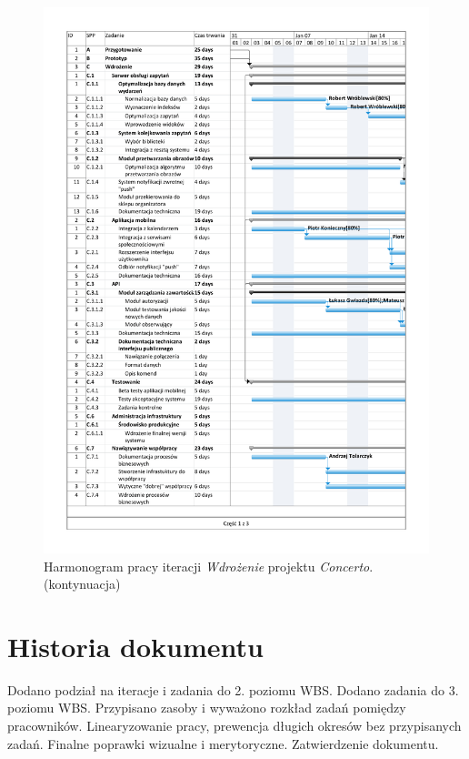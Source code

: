 \documentclass[10pt]{dokument-ppi}
\begin{document}
\begin{figure}[p]
    \ContinuedFloat
    \includegraphics[trim=1.2cm 1.2cm 1.2cm 1.2cm, page=3, width=\textwidth]{./figury/harmonogram-pracy-C-wdrozenie}
    \caption[]{Harmonogram pracy iteracji \emph{Wdrożenie} projektu \emph{Concerto}. (kontynuacja)}
\end{figure}


\section{Historia dokumentu}
\begin{versions}
        Dodano podział na iteracje i zadania do 2. poziomu WBS.
        Dodano zadania do 3. poziomu WBS.
        Przypisano zasoby i wyważono rozkład zadań pomiędzy pracowników.
        Linearyzowanie pracy, prewencja długich okresów bez przypisanych zadań.
        Finalne poprawki wizualne i merytoryczne.
        Zatwierdzenie dokumentu.
\end{versions}
\end{document}
